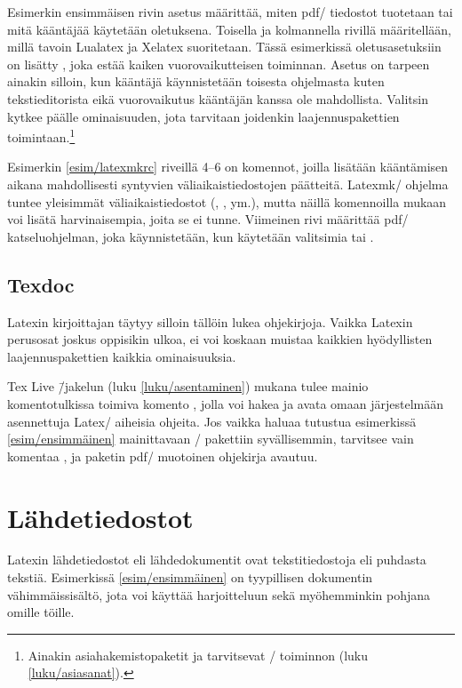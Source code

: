 Esimerkin ensimmäisen rivin asetus määrittää, miten pdf\-/ tiedostot
tuotetaan tai mitä kääntäjää käytetään oletuksena. Toisella ja
kolmannella rivillä määritellään, millä tavoin Lualatex ja Xelatex
suoritetaan. Tässä esimerkissä oletusasetuksiin on lisätty
, joka estää kaiken
vuorovaikutteisen toiminnan. Asetus on tarpeen ainakin silloin, kun
kääntäjä käynnistetään toisesta ohjelmasta kuten tekstieditorista eikä
vuorovaikutus kääntäjän kanssa ole mahdollista. Valitsin
 kytkee päälle ominaisuuden, jota tarvitaan
joidenkin laajennuspakettien toimintaan.\footnote{Ainakin
  asiahakemistopaketit  ja 
  tarvitsevat \-/ toiminnon (luku
  \ref{luku/asiasanat}).}

Esimerkin \ref{esim/latexmkrc} riveillä 4--6 on komennot, joilla
lisätään kääntämisen aikana mahdollisesti syntyvien
väliaikaistiedostojen päätteitä. Latexmk\-/ ohjelma tuntee yleisimmät
väliaikaistiedostot (, ,  ym.), mutta
näillä komennoilla mukaan voi lisätä harvinaisempia, joita se ei tunne.
Viimeinen rivi määrittää pdf\-/ katseluohjelman, joka käynnistetään, kun
käytetään valitsimia  tai .

\subsection{Texdoc}

Latexin kirjoittajan täytyy silloin tällöin lukea ohjekirjoja. Vaikka
Latexin perusosat joskus oppisikin ulkoa, ei voi koskaan muistaa
kaikkien hyödyllisten laajennuspakettien kaikkia ominaisuuksia.

Tex Live \=/jakelun (luku \ref{luku/asentaminen}) mukana tulee mainio
komentotulkissa toimiva komento , jolla voi hakea ja avata
omaan järjestelmään asennettuja Latex\-/ aiheisia ohjeita. Jos vaikka
haluaa tutustua esimerkissä \ref{esim/ensimmäinen} mainittavaan
\-/ pakettiin syvällisemmin, tarvitsee vain komentaa
, ja paketin pdf\-/ muotoinen ohjekirja avautuu.

\section{Lähdetiedostot}
\label{luku/lähdetiedosto}

Latexin lähdetiedostot eli lähdedokumentit ovat tekstitiedostoja eli
puhdasta tekstiä. Esimerkissä \ref{esim/ensimmäinen} on tyypillisen
dokumentin vähimmäissisältö, jota voi käyttää harjoitteluun sekä
myöhemminkin pohjana omille töille.

